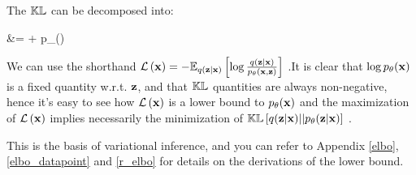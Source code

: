 The $\mathbb{KL}$ can be decomposed  into:

\begin{nalign}
&= 
+ \log p_\theta(\boldx)
\end{nalign}

We can use the shorthand $\mathcal{L}\left(\mathbf{x}\right) = - 
\mathbb{E}_{q(\mathbf{z}|\mathbf{x})}\left[ 
    \log\frac{
        q(\mathbf{z}|\mathbf{x}) 
    }{
        p_\theta(\mathbf{x},\mathbf{z})
    }
 \right]
$ .It is clear that $\log p_\theta(\mathbf{x})$
is a fixed quantity w.r.t. $\mathbf{z}$,
and that $\mathbb{KL}$ quantities are
always non-negative,
hence it's easy to see how $\mathcal{L}\left(\mathbf{x}\right)$
is a lower bound to $p_\theta(\mathbf{x})$
and the maximization of $\mathcal{L}\left(\mathbf{x}\right)$
implies necessarily the minimization of 
$\mathbb{KL}\left[ q(\mathbf{z}|\mathbf{x}) || p_\theta(\mathbf{z}|\mathbf{x}) \right]$
.

This is the basis of variational inference, and 
you can refer to Appendix \ref{elbo},  
\ref{elbo_datapoint}
and
\ref{r_elbo}
for details on the derivations of the lower bound.


